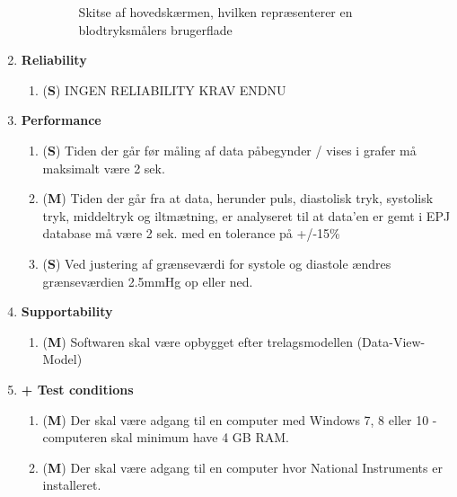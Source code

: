 \begin{enumerate}
\begin{enumerate}
\begin{figure}[h!]
\caption{Skitse af hovedskærmen, hvilken repræsenterer en blodtryksmålers brugerflade}
\end{figure}
\end{enumerate}
\item \textbf{Reliability}
\begin{enumerate}
\item (\textbf{S}) INGEN RELIABILITY KRAV ENDNU
\end{enumerate}
\item \textbf{Performance}
\begin{enumerate}
\item (\textbf{S}) Tiden der går før måling af data påbegynder / vises i grafer må maksimalt være 2 sek.
\item (\textbf{M}) Tiden der går fra at data, herunder puls, diastolisk tryk, systolisk tryk, middeltryk og iltmætning, er analyseret til at data'en er gemt i EPJ database må være 2 sek. med en tolerance på +/-15\% 
\item (\textbf{S}) Ved justering af grænseværdi for systole og diastole ændres grænseværdien 2.5mmHg op eller ned.                                                                                                                                                                                                                                                                                                                                                                                                                                                                                                                                                                                                                                                                                               
\end{enumerate}
\item \textbf{Supportability}
\begin{enumerate}
\item (\textbf{M}) Softwaren skal være opbygget efter trelagsmodellen (Data-View-Model)
\end{enumerate}
\item \textbf{+ Test conditions}
\begin{enumerate}
\item (\textbf{M}) Der skal være adgang til en computer med Windows 7, 8 eller 10 - computeren skal minimum have 4 GB RAM.
\item (\textbf{M}) Der skal være adgang til en computer hvor National Instruments er installeret.
\end{enumerate}
\end{enumerate}
